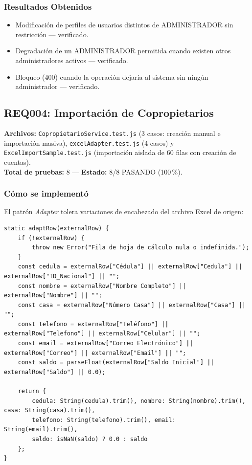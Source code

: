 \documentclass[12pt,a4paper]{article}
\begin{document}
\subsubsection*{Resultados Obtenidos}
\begin{itemize}[nosep]
    \item Modificación de perfiles de usuarios distintos de ADMINISTRADOR sin restricción — verificado.
    \item Degradación de un ADMINISTRADOR permitida cuando existen otros administradores activos — verificado.
    \item Bloqueo (400) cuando la operación dejaría al sistema sin ningún administrador — verificado.
\end{itemize}

\subsection{REQ004: Importación de Copropietarios}
\textbf{Archivos:} \texttt{CopropietarioService.test.js} (3 casos: creación manual e
importación masiva), \texttt{excelAdapter.test.js} (4 casos) y
\texttt{ExcelImportSample.test.js} (importación aislada de 60 filas con creación de cuentas).\\
\textbf{Total de pruebas:} 8 — \textbf{Estado:} 8/8 PASANDO (100\,\%).

\subsubsection*{Cómo se implementó}

El patrón \emph{Adapter} tolera variaciones de encabezado del archivo Excel de origen:

\begin{lstlisting}[caption={\texttt{ExcelCopropietarioAdapter.adaptRow} (\texttt{src/core/business/patterns/excelAdapter.js})}]
static adaptRow(externalRow) {
    if (!externalRow) {
        throw new Error("Fila de hoja de cálculo nula o indefinida.");
    }
    const cedula = externalRow["Cédula"] || externalRow["Cedula"] || externalRow["ID_Nacional"] || "";
    const nombre = externalRow["Nombre Completo"] || externalRow["Nombre"] || "";
    const casa = externalRow["Número Casa"] || externalRow["Casa"] || "";
    const telefono = externalRow["Teléfono"] || externalRow["Telefono"] || externalRow["Celular"] || "";
    const email = externalRow["Correo Electrónico"] || externalRow["Correo"] || externalRow["Email"] || "";
    const saldo = parseFloat(externalRow["Saldo Inicial"] || externalRow["Saldo"] || 0.0);

    return {
        cedula: String(cedula).trim(), nombre: String(nombre).trim(), casa: String(casa).trim(),
        telefono: String(telefono).trim(), email: String(email).trim(),
        saldo: isNaN(saldo) ? 0.0 : saldo
    };
}
\end{lstlisting}
\end{document}
